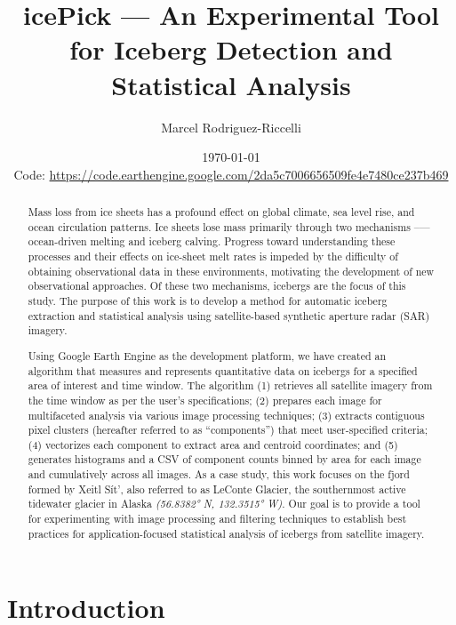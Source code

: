 \documentclass[11pt, letterpaper]{article}
\title{icePick — An Experimental Tool for Iceberg Detection and Statistical Analysis}
\author{Marcel Rodriguez-Riccelli}
\date{\today \\[1em] \small Code: \url{https://code.earthengine.google.com/2da5c7006656509fe4e7480ce237b469}}
\begin{document}
\maketitle
\thispagestyle{empty}

\begin{abstract}
    
Mass loss from ice sheets has a profound effect on global climate, sea level rise, and ocean circulation patterns. Ice sheets lose mass primarily through two mechanisms --— ocean-driven melting and iceberg calving. Progress toward understanding these processes and their effects on ice-sheet melt rates is impeded by the difficulty of obtaining observational data in these environments, motivating the development of new observational approaches. Of these two mechanisms, icebergs are the focus of this study. The purpose of this work is to develop a method for automatic iceberg extraction and statistical analysis using satellite-based synthetic aperture radar (SAR) imagery.

Using Google Earth Engine as the development platform, we have created an algorithm that measures and represents quantitative data on icebergs for a specified area of interest and time window. The algorithm (1) retrieves all satellite imagery from the time window as per the user's specifications; (2) prepares each image for multifaceted analysis via various image processing techniques; (3) extracts contiguous pixel clusters (hereafter referred to as ``components'') that meet user-specified criteria; (4) vectorizes each component to extract area and centroid coordinates; and (5) generates histograms and a CSV of component counts binned by area for each image and cumulatively across all images. As a case study, this work focuses on the fjord formed by Xeitl Sít’, also referred to as LeConte Glacier, the southernmost active tidewater glacier in Alaska \textit{(56.8382° N, 132.3515° W)}. Our goal is to provide a tool for experimenting with image processing and filtering techniques to establish best practices for application-focused statistical analysis of icebergs from satellite imagery.

\end{abstract}
\thispagestyle{empty}
\setcounter{page}{0} 

\section{Introduction}
\onehalfspacing
 
\end{document}
